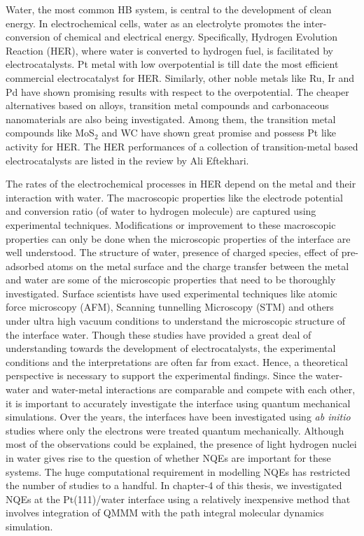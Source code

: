 \noindent Water, the most common HB system, is central to the development of clean energy. In electrochemical cells, water as an electrolyte promotes the inter-conversion of chemical and electrical energy. Specifically, Hydrogen Evolution Reaction (HER), where water is converted to hydrogen fuel, is facilitated by electrocatalysts. Pt metal with low overpotential\cite{li2019recent,eftekhari2017electrocatalysts} is till date the most efficient commercial electrocatalyst for HER. Similarly, other noble metals like Ru, Ir and Pd have shown promising results with respect to the overpotential\cite{li2019recent,sarkar2018overview}. The cheaper alternatives based on alloys, transition metal compounds and carbonaceous nanomaterials are also being investigated\cite{eftekhari2017electrocatalysts}. Among them, the transition metal compounds like MoS$_2$\cite{jaramillo2007identification} and WC\cite{fan2015wc} have shown great promise and possess Pt like activity for HER. The HER performances of a collection of transition-metal based electrocatalysts are listed in the review\cite{eftekhari2017electrocatalysts} by Ali Eftekhari. 

\noindent The rates of the electrochemical processes in  HER depend on the  metal and their interaction with water. The macroscopic properties like the electrode potential and conversion ratio (of water to hydrogen molecule) are captured using experimental techniques. Modifications or improvement to these macroscopic properties can only be done when the microscopic properties of the interface are well understood.  The structure of water, presence of charged species, effect of pre-adsorbed atoms on the metal surface and the charge transfer between the metal and water are some of the microscopic properties that need to be thoroughly investigated. Surface scientists have used experimental techniques like atomic force microscopy\cite{tian2022visualizing} (AFM), Scanning tunnelling Microscopy\cite{gewirth1997electrochemical} (STM) and others\cite{magnussen2019toward} under ultra high vacuum conditions to understand the microscopic structure of the interface water. Though these studies have provided a great deal of understanding towards the development of electrocatalysts, the experimental conditions and the interpretations are often far from exact. Hence, a theoretical perspective is necessary to support the experimental findings. Since the water-water and water-metal interactions are comparable and compete with each other, it is important to accurately investigate the interface using quantum mechanical simulations. Over the years, the interfaces have been investigated using \textit{ab initio} studies where only the electrons were treated quantum mechanically. Although most of the observations could be explained, the presence of light hydrogen nuclei in water gives rise to the question of whether NQEs are important for these systems. The huge computational requirement in modelling NQEs has restricted the number of studies to a handful\cite{lan2020ionization,tian2022visualizing,yan2020nuclear}. In chapter-4 of this thesis, we investigated NQEs at the Pt(111)/water interface using a relatively inexpensive method that involves integration of QMMM with the path integral molecular dynamics simulation. 

